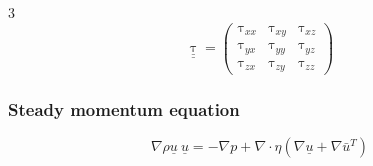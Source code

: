 \documentclass[landscape, a4paper]{article}
\renewcommand{\tau}{\uptau}
\renewcommand{\u}{\underline}
\begin{document}
\begin{multicols*}{3}
\[
  \u{\u{\tau}} =
  \begin{pmatrix}
    \tau_{xx} & \tau_{xy} & \tau_{xz} \\
    \tau_{yx} & \tau_{yy} & \tau_{yz} \\
    \tau_{zx} & \tau_{zy} & \tau_{zz}
  \end{pmatrix}
\]

\subsubsection{Steady momentum equation}
\[\nabla\rho\u{u}\ \u{u} = -\nabla p + \nabla\cdot \eta\left(\nabla\u{u} + \nabla\bar{u}^T\right)\]







































































\end{multicols*}
\end{document}
